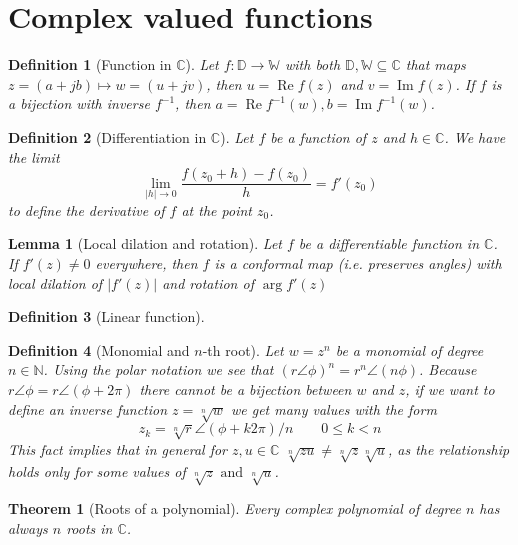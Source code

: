 \documentclass[twocolumn, margin=small]{tex/hsrzf}
\newcommand\Nset{\mathbb{N}}
\newcommand\Cset{\mathbb{C}}
\newcommand\len[1]{\lvert#1\rvert}
\renewcommand\Re{\operatorname{Re}}
\renewcommand\Im{\operatorname{Im}}
\theoremstyle{komfourzf}
\newtheorem{theorem}{Theorem}
\newtheorem{definition}{Definition}
\newtheorem{lemma}{Lemma}
\begin{document}
\section{Complex valued functions}

\begin{definition}[Function in \(\Cset\)]
  Let \(f: \mathbb{D} \to \mathbb{W}\) with both \(\mathbb{D}, \mathbb{W} \subseteq \Cset\) 
  that maps \(z = (a + jb) \mapsto w = (u + jv)\),
  then \(u = \Re f(z)\) and \(v = \Im f(z)\).
  If \(f\) is a bijection with inverse \(f^{-1}\), then \(a = \Re f^{-1}(w), b = \Im f^{-1}(w)\).
\end{definition}

\begin{definition}[Differentiation in \(\Cset\)]
  Let \(f\) be a function of \(z\) and \(h \in \Cset\). We have the limit
  \[
    \lim_{\len{h} \to 0} \frac{f(z_0 + h) - f(z_0)}{h} = f'(z_0)
  \]
  to define the \emph{derivative} of \(f\) at the point \(z_0\).
\end{definition}

\begin{lemma}[Local dilation and rotation]
  Let \(f\) be a differentiable function in \(\Cset\).
  If \(f'(z) \neq 0\) everywhere, then \(f\) is a conformal map (i.e. preserves angles) with local dilation of \(\len{f'(z)}\) and rotation of \(\arg f'(z)\)
\end{lemma}

\begin{definition}[Linear function]

\end{definition}

\begin{definition}[Monomial and \(n\)-th root]
  Let \(w = z^n\) be a monomial of degree \(n\in\Nset\). Using the polar notation we see that
  \((r\angle \phi)^n = r^n \angle (n\phi)\). Because \(r\angle\phi = r\angle(\phi+2\pi)\) there cannot be a bijection between \(w\) and \(z\), if we want to define an inverse function \(z = \sqrt[n]{w}\) we get many values with the form
  \[
    z_k = \sqrt[n]{r}\angle(\phi + k2\pi)/n \qquad 0 \leq k < n
  \]
  This fact implies that in general for \(z,u \in\Cset\) \(\sqrt[n]{zu} \neq \sqrt[n]{z}\sqrt[n]{u}\), as the relationship holds only for \emph{some} values of \(\sqrt[n]{z} \text{ and } \sqrt[n]{u}\).
\end{definition}

\begin{theorem}[Roots of a polynomial]
  Every complex polynomial of degree \(n\) has always \(n\) roots in \(\Cset\).
\end{theorem}
\end{document}
